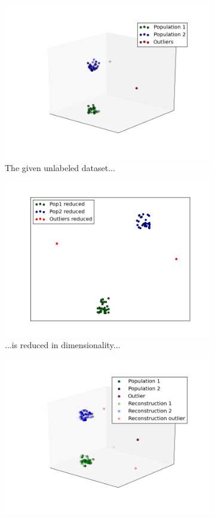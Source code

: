\documentclass{vldb}
\begin{document}
\begin{figure}
\begin{subfigure}{\linewidth}
	\centering
	\includegraphics[width=\linewidth]{"pics/outlier_basic"}
	\caption{The given unlabeled dataset...}
	\label{subfig:reduction-a}
\end{subfigure}
\begin{subfigure}{\linewidth}
  \centering
  \includegraphics[width=.76\linewidth]{"pics/reduced-rep"}
  \caption{...is reduced in dimensionality...}
  \label{subfig:reduction-b}
\end{subfigure}
\begin{subfigure}{\linewidth}
  \centering
  \includegraphics[width=.9\linewidth]{"pics/reconstruction"}

\end{subfigure}
\end{figure}
\end{document}
